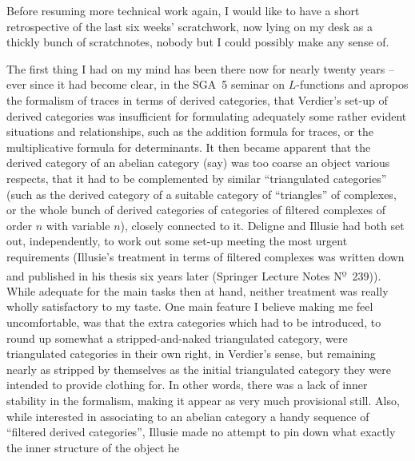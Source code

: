 \bigbreak

\presectionfill{}\par

\label{sec:69}%
Before resuming more technical work again, I would like to have a
short retrospective of the last six weeks' scratchwork, now lying on
my desk as a thickly bunch of scratchnotes, nobody but I could
possibly make any sense of.

The first thing I had on my mind has been there now for nearly twenty
years -- ever since it had become clear, in the SGA~5 seminar on
$L$-functions and apropos the formalism of traces in terms of derived
categories, that Verdier's set-up of derived categories was
insufficient for formulating adequately some rather evident situations
and relationships, such as the addition formula for traces, or the
multiplicative formula for determinants. It then became apparent that
the derived category of an abelian category (say) was too coarse an
object various respects, that it had to be complemented by similar
``triangulated categories'' (such as the derived category of a
suitable category of ``triangles'' of complexes, or the whole bunch of
derived categories of categories of filtered complexes of order $n$
with variable $n$), closely connected to it. Deligne and Illusie had
both set out, independently, to work out some set-up meeting the most
urgent requirements (Illusie's treatment in terms of filtered
complexes was written down and published in his thesis six years later
(Springer Lecture Notes N\textsuperscript{\b o}~239)).%
While adequate for the main tasks then at hand, neither treatment was
really wholly satisfactory to my taste. One main feature I believe
making me feel uncomfortable, was that the extra categories which had
to be introduced, to round up somewhat a stripped-and-naked
triangulated category, were triangulated categories in their own
right, in Verdier's sense, but remaining nearly as stripped by
themselves as the initial triangulated category they were intended to
provide clothing for. In other words, there was a lack of inner
stability in the formalism, making it appear as very much provisional
still. Also, while interested in associating to an abelian category a
handy sequence of ``filtered derived categories'', Illusie made no
attempt to pin down what exactly the inner structure of the object he
